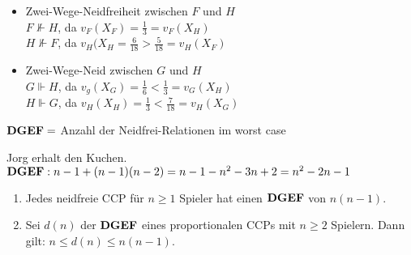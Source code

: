 \begin{beispiel*}
\begin{itemize}
  \item[] Zwei-Wege-Neidfreiheit zwischen $F$ und $H$\\ $F\nVdash H$, da $v_F(X_F)=\frac{1}{3}=v_F(X_H)$\\
          $H\nVdash F$, da $v_H(X_H=\frac{6}{18}>\frac{5}{18}=v_H(X_F)$
  \item[] Zwei-Wege-Neid zwischen $G$ und $H$\\$G\Vdash H$, da $v_g(X_G)=\frac{1}{6}<\frac{1}{3}=v_G(X_H)$\\
          $H\Vdash G$, da $v_H(X_H)=\frac{1}{3}<\frac{7}{18}=v_H(X_G)$
 \end{itemize}
\end{beispiel*}
$\text{\textbf{DGEF}} =$ Anzahl der Neidfrei-Relationen im worst case
\begin{protokoll*}
 Jorg erhalt den Kuchen.\\
 $\text{\textbf{DGEF}}: n-1+(n-1)(n-2)=n-1-n^2-3n+2=n^2-2n-1$
\end{protokoll*}
\begin{satz*}
 \begin{enumerate}
  \item Jedes neidfreie CCP für $n\geq1$ Spieler hat einen $\text{\textbf{DGEF}}$ von $n(n-1)$.
  \item Sei $d(n)$ der $\text{\textbf{DGEF}}$ eines proportionalen CCPs mit $n\geq2$ Spielern. Dann gilt: $n\leq d(n)\leq n(n-1)$.
 \end{enumerate}
\end{satz*}
